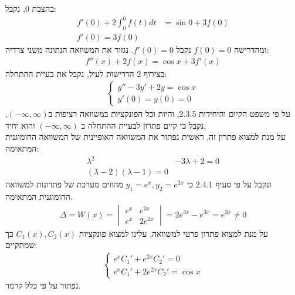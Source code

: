 \documentclass{article}
\begin{document}
בהצבת 0, נקבל:
\begin{align*}
    f'(0)+2\int_0^0 f(t)dt & = \sin 0 + 3f(0) \\
    f'(0) = 3f(0)
\end{align*}
ומהדרישה $f(0)=0$ נקבל $f'(0)=0$. נגזור את המשוואה הנתונה משני צדדיה:
\begin{align*}
    f''(x) + 2f(x) = \cos x + 3 f'(x)
\end{align*}
בצירוף 2 הדרישות לעיל, נקבל את בעיית ההתחלה:
\begin{align*}
    \begin{cases}
        y''-3y'+2y = \cos x \\
        y'(0) = y(0) = 0
    \end{cases}
\end{align*}
על פי משפט הקיום והיחידות 2.3.5, והיות וכל הפונקציות במשוואה רציפות ב$(-\infty, \infty)$, נקבל כי קיים פתרון לבעיית ההתחלה ב $(-\infty, \infty)$ והוא יחיד.\\
על מנת למצוא פתרון זה, ראשית נפתור את המשוואה האופיינית של המשוואה ההומוגנית המתאימה:
\begin{align*}
    \lambda^2 & -3\lambda+2=0 \\
    (\lambda-2)(\lambda-1)=0
\end{align*}
ונקבל על פי סעיף 2.4.1 כי $y_1=e^{x}, y_2=e^{2x}$ מהווים מערכת של פתרונות למשוואה ההומוגנית המתאימה.
\begin{align*}
    \Delta = W(x) = \begin{vmatrix}
                        e^x & e^{2x}  \\
                        e^x & 2e^{2x}
                    \end{vmatrix} = 2e^{3x} - e^{3x} = e^{3x} \ne 0
\end{align*}
על מנת למצוא פתרון פרטי למשוואה, עלינו למצוא פונקציות $C_1(x), C_2(x)$ כך שמתקיים:
\begin{align*}
    \begin{cases}
        e^x C_1' + e^{2x} C_2' = 0 \\
        e^x C_1' + 2 e^{2x} C_2' = \cos x
    \end{cases}
\end{align*}
נפתור על פי כלל קרמר.
\end{document}
